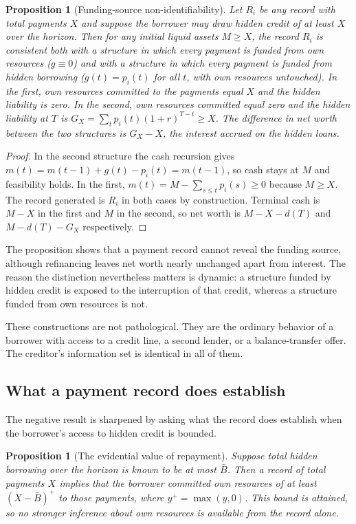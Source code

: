 \documentclass[11pt]{article}
\newtheorem{proposition}[theorem]{Proposition}
\theoremstyle{definition}
\theoremstyle{remark}
\begin{document}
\begin{proposition}[Funding-source non-identifiability]\label{prop:funding}
Let $R_i$ be any record with total payments $X$ and suppose the borrower may draw hidden credit of at least $X$ over the horizon. Then for any initial liquid assets $M\ge X$, the record $R_i$ is consistent both with a structure in which every payment is funded from own resources ($g\equiv 0$) and with a structure in which every payment is funded from hidden borrowing ($g(t)=p_i(t)$ for all $t$, with own resources untouched). In the first, own resources committed to the payments equal $X$ and the hidden liability is zero. In the second, own resources committed equal zero and the hidden liability at $T$ is $G_X=\sum_t p_i(t)(1+r)^{T-t}\ge X$. The difference in net worth between the two structures is $G_X-X$, the interest accrued on the hidden loans.
\end{proposition}

\begin{proof}
In the second structure the cash recursion gives $m(t)=m(t-1)+g(t)-p_i(t)=m(t-1)$, so cash stays at $M$ and feasibility holds. In the first, $m(t)=M-\sum_{s\le t}p_i(s)\ge 0$ because $M\ge X$. The record generated is $R_i$ in both cases by construction. Terminal cash is $M-X$ in the first and $M$ in the second, so net worth is $M-X-d(T)$ and $M-d(T)-G_X$ respectively.
\end{proof}

The proposition shows that a payment record cannot reveal the funding source, although refinancing leaves net worth nearly unchanged apart from interest. The reason the distinction nevertheless matters is dynamic: a structure funded by hidden credit is exposed to the interruption of that credit, whereas a structure funded from own resources is not.

These constructions are not pathological. They are the ordinary behavior of a borrower with access to a credit line, a second lender, or a balance-transfer offer. The creditor's information set is identical in all of them.

\subsection{What a payment record does establish}

The negative result is sharpened by asking what the record does establish when the borrower's access to hidden credit is bounded.

\begin{proposition}[The evidential value of repayment]\label{prop:value}
Suppose total hidden borrowing over the horizon is known to be at most $\bar B$. Then a record of total payments $X$ implies that the borrower committed own resources of at least $(X-\bar B)^+$ to those payments, where $y^+=\max(y,0)$. This bound is attained, so no stronger inference about own resources is available from the record alone.
\end{proposition}
\end{document}
